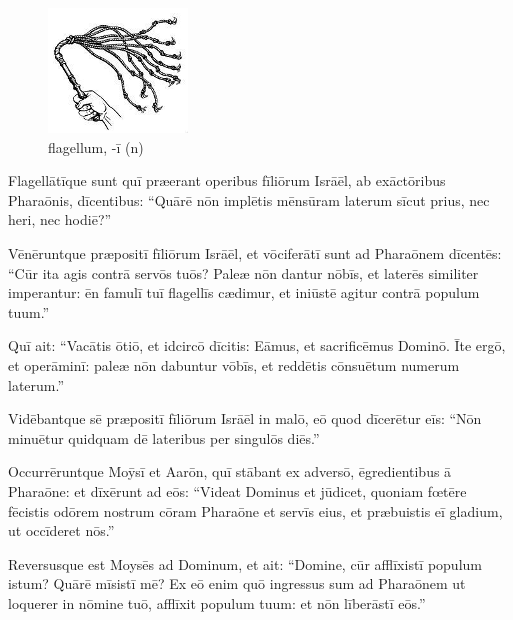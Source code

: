 \begin{figure}[H]
    \begin{minipage}[]{0.5\linewidth}
        \centering
        \includegraphics{flagellum}
        \caption{flagellum, -ī (n)}
    \end{minipage}%
\end{figure}
Flagellātīque sunt quī præerant operibus fīliōrum Isrāēl,
ab exāctōribus Pharaōnis, dīcentibus: ``Quārē nōn implētis
mēnsūram laterum sīcut prius, nec heri, nec hodiē?''

Vēnēruntque præpositī fīliōrum
Isrāēl, et vōciferātī sunt ad Pharaōnem
dīcentēs: \linebreak``Cūr ita agis contrā servōs tuōs?
Paleæ nōn dantur nōbīs, et laterēs similiter
imperantur: ēn famulī tuī flagellīs cædimur,
et iniūstē agitur contrā populum tuum.''

Quī ait: ``Vacātis ōtiō,
et idcircō dīcitis: 
Eāmus, et sacrificēmus Dominō. 
Īte ergō, et operāminī: paleæ
nōn dabuntur vōbīs, et reddētis cōnsuētum numerum laterum.''

Vidēbantque sē præpositī fīliōrum Isrāēl
in malō, eō quod dīcerētur eīs: ``Nōn minuētur quidquam
dē lateribus per singulōs diēs.''

Occurrēruntque Moȳsī et Aarōn, quī stābant ex adversō,
ēgredientibus ā Pharaōne: et dīxērunt
ad eōs: ``Videat Dominus et jūdicet, quoniam
fœtēre fēcistis odōrem nostrum cōram Pharaōne
et servīs eius, et præbuistis eī
gladium, ut occīderet nōs.'' 

Reversusque est Moysēs ad Dominum, et ait: ``Domine, cūr
afflīxistī populum istum? Quārē mīsistī mē? Ex eō
enim quō ingressus sum ad Pharaōnem ut
loquerer in nōmine tuō, afflīxit populum
tuum: et nōn līberāstī eōs.''
